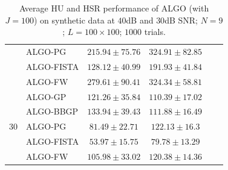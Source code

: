 \begin{table}[h]
\begin{adjustbox}{max width=\textwidth}
\begin{tabular}{|c|l|c|c|c|c|}
                    & ALGO-PG                    & $215.94   \pm 75.76$  & $324.91   \pm 82.85$ \tabularnewline
                    & ALGO-FISTA                 & $128.12   \pm 40.99$  & $191.93   \pm 41.84$ \tabularnewline
                    & ALGO-FW                    & $279.61   \pm 90.41$  & $324.34   \pm 58.81$ \tabularnewline \cline{1-4}
\multirow{5}{*}{30} & ALGO-GP                    & $121.26   \pm 35.84$  & $110.39   \pm 17.02$ \tabularnewline
                    & ALGO-BBGP                  & $133.94   \pm 39.43$  & $111.88   \pm 16.49$ \tabularnewline
                    & ALGO-PG                    & $81.49    \pm 22.71$  & $122.13   \pm 16.3$  \tabularnewline
                    & ALGO-FISTA                 & $53.97    \pm 15.75$  & $79.78    \pm 13.29$ \tabularnewline
                    & ALGO-FW                    & $105.98   \pm 33.02$  & $120.38   \pm 14.36$ \tabularnewline \cline{1-4}
\end{tabular}
\end{adjustbox}
\caption{Average HU and HSR performance of ALGO (with $J=100$) on synthetic
         data at $40$dB and $30$dB SNR; $N = 9$; $L = 100 \times 100$; $1000$
         trials.}
\label{table:results_full_MO9_SNR4030dB_J100}
\end{table}

\newpage

